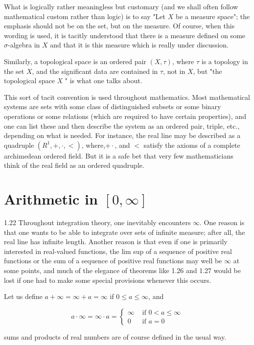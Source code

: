 \documentclass[10pt]{article}
\begin{document}
What is logically rather meaningless but customary (and we shall often follow mathematical custom rather than logic) is to say "Let $X$ be a measure space"; the emphasis should not be on the set, but on the measure. Of course, when this wording is used, it is tacitly understood that there is a measure defined on some $\sigma$-algebra in $X$ and that it is this measure which is really under discussion.

Similarly, a topological space is an ordered pair $(X, \tau)$, where $\tau$ is a topology in the set $X$, and the significant data are contained in $\tau$, not in $X$, but "the topological space $X$ " is what one talks about.

This sort of tacit convention is used throughout mathematics. Most mathematical systems are sets with some class of distinguished subsets or some binary operations or some relations (which are required to have certain properties), and one can list these and then describe the system as an ordered pair, triple, etc., depending on what is needed. For instance, the real line may be described as a quadruple $\left(R^{1},+, \cdot,<\right)$, where,$+ \cdot$, and $<$ satisfy the axioms of a complete archimedean ordered field. But it is a safe bet that very few mathematicians think of the real field as an ordered quadruple.

\section{Arithmetic in $[0, \infty]$}
1.22 Throughout integration theory, one inevitably encounters $\infty$. One reason is that one wants to be able to integrate over sets of infinite measure; after all, the real line has infinite length. Another reason is that even if one is primarily interested in real-valued functions, the lim sup of a sequence of positive real functions or the sum of a sequence of positive real functions may well be $\infty$ at some points, and much of the elegance of theorems like 1.26 and 1.27 would be lost if one had to make some special provisions whenever this occurs.

Let us define $a+\infty=\infty+a=\infty$ if $0 \leq a \leq \infty$, and

$$
a \cdot \infty=\infty \cdot a= \begin{cases}\infty & \text { if } 0<a \leq \infty \\ 0 & \text { if } a=0\end{cases}
$$

sums and products of real numbers are of course defined in the usual way.
\end{document}
